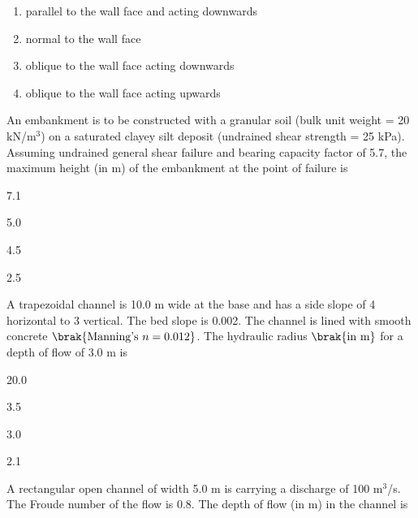 \begin{enumerate}
    \item parallel to the wall face and acting downwards
    \item normal to the wall face
    \item oblique to the wall face acting downwards
    \item oblique to the wall face acting upwards
\end{enumerate}
\item An embankment is to be constructed with a granular soil (bulk unit weight = 20 kN/m$^3$) on a saturated clayey silt deposit (undrained shear strength = 25 kPa). Assuming undrained general shear failure and bearing capacity factor of 5.7, the maximum height (in m) of the embankment at the point of failure is

\begin{enumerate}
\begin{multicols}{4}
    \item 7.1
    \item 5.0
    \item 4.5
    \item 2.5
    \end{multicols}
\end{enumerate}

\item A trapezoidal channel is 10.0 m wide at the base and has a side slope of 4 horizontal to 3 vertical. The bed slope is 0.002. The channel is lined with smooth concrete $\brak{\text{Manning's } n=0.012}$. The hydraulic radius $\brak{\text{in m}}$ for a depth of flow of 3.0 m is

\begin{enumerate}
\begin{multicols}{4}
    \item 20.0
    \item 3.5
    \item 3.0
    \item 2.1
    \end{multicols}
\end{enumerate}

\item A rectangular open channel of width 5.0 m is carrying a discharge of 100 m$^3$/s. The Froude number of the flow is 0.8. The depth of flow (in m) in the channel is


